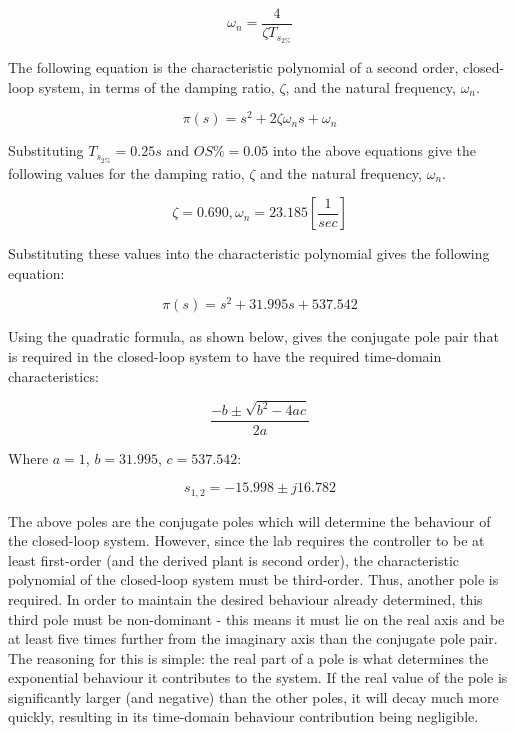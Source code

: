 \documentclass[11pt, letterpaper]{article}
\begin{document}
\begin{equation}
    \omega_n = \frac{4}{\zeta T_{s_{2\%}}}
\end{equation}

The following equation is the characteristic polynomial of a second order, closed-loop system,
in terms of the damping ratio, $\zeta$, and the natural frequency, $\omega_n$.

\begin{equation}
    \pi(s) = s^2 + 2\zeta \omega_n s + \omega_n
\end{equation}

Substituting $T_{s_{2\%}} = 0.25s$ and $OS\% = 0.05$ into the above equations give the following
values for the damping ratio, $\zeta$ and the natural frequency, $\omega_n$.

\begin{equation}
    \zeta = 0.690, \omega_n = 23.185 [\frac{1}{sec}]
\end{equation}

Substituting these values into the characteristic polynomial gives the following equation:

\begin{equation}
    \pi(s) = s^2 + 31.995s + 537.542
\end{equation}

Using the quadratic formula, as shown below, gives the conjugate pole pair that is required
in the closed-loop system to have the required time-domain characteristics:

\begin{equation}
    \frac{-b \pm \sqrt{b^2 - 4ac}}{2a}
\end{equation}

Where $a = 1$, $b = 31.995$, $c = 537.542$:

\begin{equation}
    s_{1,2} = -15.998 \pm j16.782
\end{equation}

The above poles are the conjugate poles which will determine the behaviour of the closed-loop
system. However, since the lab requires the controller to be at least first-order (and the
derived plant is second order), the characteristic polynomial of the closed-loop system
must be third-order. Thus, another pole is required. In order to maintain the desired behaviour
already determined, this third pole must be non-dominant - this means it must lie on the real
axis and be at least five times further from the imaginary axis than the conjugate pole pair.
The reasoning for this is simple: the real part of a pole is what determines the exponential
behaviour it contributes to the system. If the real value of the pole is significantly larger (and negative)
than the other poles, it will decay much more quickly, resulting in its time-domain behaviour
contribution being negligible. \par
\end{document}
